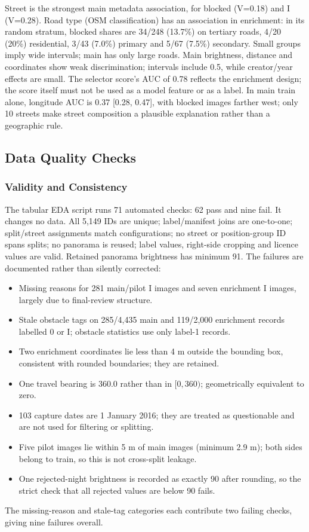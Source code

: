 Street is the strongest main metadata association, for blocked (V=0.18) and I (V=0.28). Road type (OSM classification) has an association in enrichment: in its random stratum, blocked shares are 34/248 (13.7\%) on tertiary roads, 4/20 (20\%) residential, 3/43 (7.0\%) primary and 5/67 (7.5\%) secondary. Small groups imply wide intervals; main has only large roads. Main brightness, distance and coordinates show weak discrimination; intervals include 0.5, while creator/year effects are small. The selector score's AUC of 0.78 reflects the enrichment design; the score itself must not be used as a model feature or as a label. In main train alone, longitude AUC is 0.37 [0.28, 0.47], with blocked images farther west; only 10 streets make street composition a plausible explanation rather than a geographic rule.

\subsection{Data Quality Checks}\label{en:quality}
\subsubsection*{Validity and Consistency}
The tabular EDA script runs 71 automated checks: 62 pass and nine fail. It changes no data. All 5,149 IDs are unique; label/manifest joins are one-to-one; split/street assignments match configurations; no street or position-group ID spans splits; no panorama is reused; label values, right-side cropping and licence values are valid. Retained panorama brightness has minimum 91. The failures are documented rather than silently corrected:
\begin{itemize}
\item Missing reasons for 281 main/pilot I images and seven enrichment I images, largely due to final-review structure.
\item Stale obstacle tags on 285/4,435 main and 119/2,000 enrichment records labelled 0 or I; obstacle statistics use only label-1 records.
\item Two enrichment coordinates lie less than 4 m outside the bounding box, consistent with rounded boundaries; they are retained.
\item One travel bearing is 360.0 rather than in $[0,360)$; geometrically equivalent to zero.
\item 103 capture dates are 1 January 2016; they are treated as questionable and are not used for filtering or splitting.
\item Five pilot images lie within 5 m of main images (minimum 2.9 m); both sides belong to train, so this is not cross-split leakage.
\item One rejected-night brightness is recorded as exactly 90 after rounding, so the strict check that all rejected values are below 90 fails.
\end{itemize}
The missing-reason and stale-tag categories each contribute two failing checks, giving nine failures overall.

